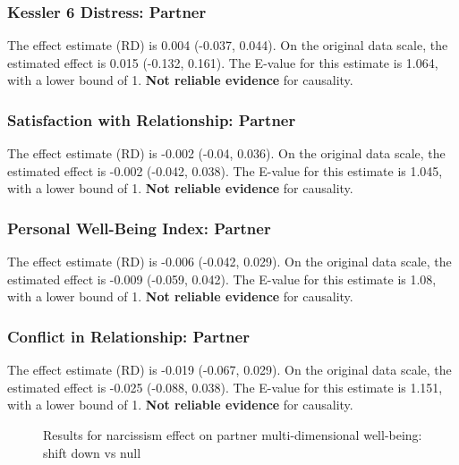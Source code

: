 \documentclass[
  singlecolumn]{article}
\begin{document}
\subsubsection{Kessler 6 Distress:
Partner}\label{kessler-6-distress-partner-6}

The effect estimate (RD) is 0.004 (-0.037, 0.044). On the original data
scale, the estimated effect is 0.015 (-0.132, 0.161). The E-value for
this estimate is 1.064, with a lower bound of 1. \textbf{Not reliable
evidence} for causality.

\subsubsection{Satisfaction with Relationship:
Partner}\label{satisfaction-with-relationship-partner-6}

The effect estimate (RD) is -0.002 (-0.04, 0.036). On the original data
scale, the estimated effect is -0.002 (-0.042, 0.038). The E-value for
this estimate is 1.045, with a lower bound of 1. \textbf{Not reliable
evidence} for causality.

\subsubsection{Personal Well-Being Index:
Partner}\label{personal-well-being-index-partner-6}

The effect estimate (RD) is -0.006 (-0.042, 0.029). On the original data
scale, the estimated effect is -0.009 (-0.059, 0.042). The E-value for
this estimate is 1.08, with a lower bound of 1. \textbf{Not reliable
evidence} for causality.

\subsubsection{Conflict in Relationship:
Partner}\label{conflict-in-relationship-partner-6}

The effect estimate (RD) is -0.019 (-0.067, 0.029). On the original data
scale, the estimated effect is -0.025 (-0.088, 0.038). The E-value for
this estimate is 1.151, with a lower bound of 1. \textbf{Not reliable
evidence} for causality.

\begin{figure}


\caption{\label{fig-results-narcissism-partner-down}Results for
narcissism effect on partner multi-dimensional well-being: shift down vs
null}

\end{figure}%
\end{document}
